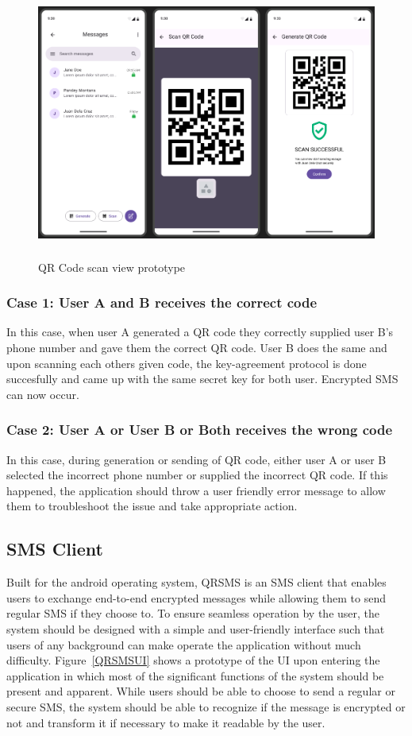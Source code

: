 \documentclass[journal]{./IEEE/IEEEtran}
\begin{document}
\begin{figure}
	\centering
	\includegraphics[height=3.5in]{./images/Scan_QR_prototype.png}
	\caption{QR Code scan view prototype}
	\label{scan_view}
\end{figure}

\subsubsection{Case 1: User A and B receives the correct code}
In this case, when user A generated a QR code they correctly supplied user B's
phone number and gave them the correct QR code. User B does the same and upon
scanning each others given code, the key-agreement protocol is done succesfully
and came up with the same secret key for both user. Encrypted SMS can now
occur.

\subsubsection{Case 2: User A or User B or Both receives the wrong code}
In this case, during generation or sending of QR code, either user A or
user B selected the incorrect phone number or supplied the incorrect QR code.
If this happened, the application should throw a user friendly error message
to allow them to troubleshoot the issue and take appropriate action.

\subsection{SMS Client}
Built for the android operating system, QRSMS is an SMS client that enables
users to exchange end-to-end encrypted messages while allowing them to
send regular SMS if they choose to. To ensure seamless operation by the
user, the system should be designed with a simple and user-friendly interface
such that users of any background can make operate the application without
much difficulty. Figure~\ref{QRSMSUI} shows a prototype of the UI upon entering
the application in which most of the significant functions
of the system should be present and apparent. While users should be able to
choose to send a regular or secure SMS, the system should be able to recognize
if the message is encrypted or not and transform it if necessary to make it
readable by the user.
\end{document}
